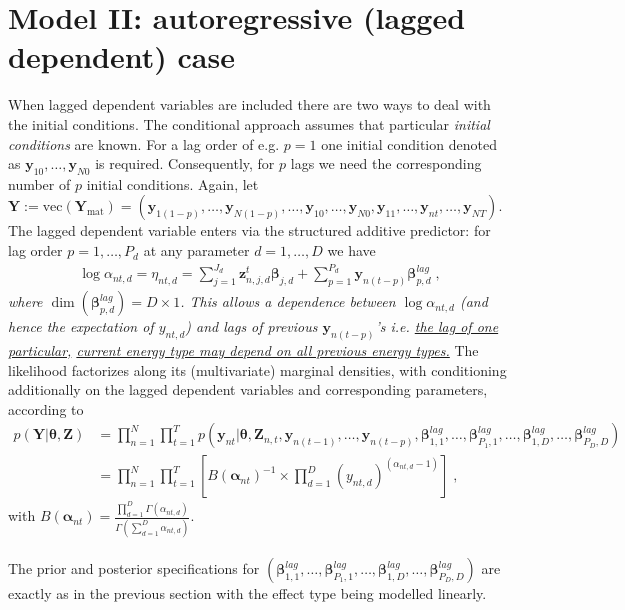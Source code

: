 \documentclass[a4paper,12pt]{scrartcl} %
\newcommand{\bs}{\boldsymbol}  %
\newcommand{\Ant}{\bs{\alpha}_{nt}}
\newcommand{\antd}{\alpha_{nt,d}}
\newcommand{\bjd}{\bs{\beta}_{j,d}}
\newcommand{\bjdlag}{\bs{\beta}_{p,d}^{lag}}
\newcommand{\ts}{\bs{\theta}}
\newcommand{\Znt}{\bs{Z}_{n,t}}
\newcommand{\Z}{\bs{Z}}
\newcommand{\znjdt}{\bs{z}_{n,j,d}^{t}}
\newcommand{\etantd}{\eta_{nt,d}}
\newcommand{\ynt}{\bs{y}_{nt}}
\newcommand{\yntlag}{\bs{y}_{n(t-p)}}
\newcommand{\yntd}{y_{nt,d}}
\newcommand{\Y}{\bs{Y}}
\newcommand{\vY}{\text{vec}(\bs{Y}_{\text{mat}})}
\newcommand{\sumd}{\sum_{d=1}^D}
\newcommand{\sumJd}{\sum_{j=1}^{J_d}}
\newcommand{\sumPd}{\sum_{p=1}^{P_d}}
\newcommand{\prodd}{\prod_{d=1}^D}
\newcommand{\prodt}{\prod_{t=1}^T}
\newcommand{\prodn}{\prod_{n=1}^{N}}
\begin{document}
\section*{Model II: autoregressive (lagged dependent) case}
When lagged dependent variables are included there are two ways to deal with the initial conditions. The conditional approach assumes that particular \textit{initial conditions} are known. For a lag order of e.g. $p=1$ one initial condition denoted as $\bs{y}_{10},\ldots,\bs{y}_{N0}$ is required. Consequently, for $p$ lags we need the corresponding number of $p$ initial conditions. Again, let  $\Y:=\vY=\left(\bs{y}_{1(1-p)},\ldots,\bs{y}_{N(1-p)},\ldots,\bs{y}_{10},\ldots,\bs{y}_{N0},\bs{y}_{11},\ldots,\ynt,\ldots,\bs{y}_{NT}\right)$. The lagged dependent variable enters via the structured additive predictor: for lag order $p=1,\ldots,P_d$ at any  parameter $d=1,\ldots,D$ we have
\begin{align*}
\log \antd = \etantd = \sumJd \znjdt\bjd + \sumPd \yntlag \bjdlag\;,
\end{align*}
\textit{where $\dim(\bjdlag)=D\times 1$. This allows a dependence between $\log \antd$ (and hence the expectation of $\yntd$) and lags of previous $\yntlag$'s i.e. \underline{the lag of one particular,} \underline{current energy type may depend on all previous energy types.}}
The likelihood factorizes along its (multivariate) marginal densities, with conditioning additionally on the lagged dependent variables and corresponding parameters, according to
\begin{align*}
p(\bs{Y}|\ts,\Z)&=\prodn\prodt p(\ynt|\ts,\Znt,\bs{y}_{n(t-1)},\ldots,\yntlag,\bs{\beta}_{1,1}^{lag},\ldots,\bs{\beta}_{P_1,1}^{lag},\ldots,
\bs{\beta}_{1,D}^{lag},\ldots,\bs{\beta}_{P_D,D}^{lag})\\
&=\prodn\prodt \left[ B(\Ant)^{-1}\times\prodd (\yntd)^{(\antd-1)}\right]\;,
\end{align*}
with $B(\Ant)=\frac{\prod_{d=1}^D\Gamma(\antd)}{\Gamma\left(\sumd \antd\right)}$. \\\\
The prior and posterior specifications for $(\bs{\beta}_{1,1}^{lag},\ldots,\bs{\beta}_{P_1,1}^{lag},\ldots,
\bs{\beta}_{1,D}^{lag},\ldots,\bs{\beta}_{P_D,D}^{lag})$ are exactly as in the previous section with the effect type being modelled linearly. 
%
%
%
%
%
\clearpage
\end{document}
